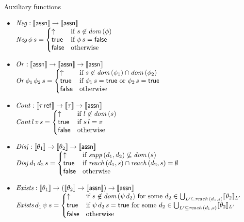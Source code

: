 \documentclass[12pt,a4paper]{report}
\newcommand{\Neg}{\nstyle{Neg}}
\newcommand{\Or}{\nstyle{Or}}
\newcommand{\Cont}{\nstyle{Cont}}
\newcommand{\Disj}{\nstyle{Disj}}
\newcommand{\Exists}{\nstyle{Exists}}
\begin{document}
\noindent Auxiliary functions
\begin{itemize}
  \item $\Neg: \semantic{\tassn} \to \semantic{\tassn}$ \\[1ex]
        $\Neg\,\phi\,s =
          \bcase
            \uparrow  & \text{if } s \not\in \dom{\phi} \\
            \true     & \text{if } \phi\,s=\false \\
            \false    & \text{otherwise}
          \ecase$

  \item $\Or: \semantic{\tassn} \to \semantic{\tassn} \to \semantic{\tassn}$ \\[1ex]
        $\Or\,\phi_1\,\phi_2\,s =
          \bcase
            \uparrow  & \text{if } s \not\in \dom{\phi_1} \cap \dom{\phi_2} \\
            \true     & \text{if } \phi_1\,s=\true \text{ or } \phi_2\,s=\true \\
            \false    & \text{otherwise}
          \ecase$

  \item $\Cont: \semantic{\tref{\tau}} \to \semantic{\tau} \to \semantic{\tassn}$ \\[1ex]
        $\Cont\,l\,v\,s =
          \bcase
            \uparrow  & \text{if } l \not\in \dom{s} \\
            \true     & \text{if } s\,l = v \\
            \false    & \text{otherwise}
          \ecase$

  \item $\Disj: \semantic{\theta_1} \to \semantic{\theta_2} \to \semantic{\tassn}$ \\[1ex]
        $\Disj\,d_1\,d_2\,s =
          \bcase
            \uparrow  & \text{if } \supp{d_1,d_2} \not\subseteq \dom{s} \\
            \true     & \text{if } \reach{d_1}{s} \cap \reach{d_2}{s} = \emptyset \\
            \false    & \text{otherwise}
          \ecase$
  
  \item $\Exists: \semantic{\theta_1} \to (\semantic{\theta_2} \to \semantic{\tassn}) \to \semantic{\tassn}$ \\[1ex]
        $\Exists\,d_1\,\psi\,s =
          \bcase
            \uparrow  & \text{if } s \not\in \dom{\psi\,d_2}
                        \text{ for some }d_2 \in \bigcup_{L'\subseteq\reach{d_1}{s}}\semantic{\theta_2}_{L'} \\
            \true     & \text{if } \psi\,d_2\,s = \true
                        \text{ for some } d_2 \in \bigcup_{L'\subseteq\reach{d_1}{s}}\semantic{\theta_2}_{L'} \\
            \false    & \text{otherwise}
          \ecase$
\end{itemize}
\end{document}
